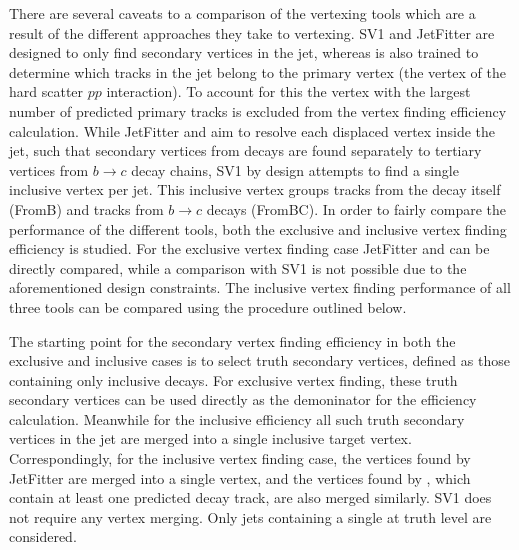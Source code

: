 
There are several caveats to a comparison of the vertexing tools which are a result of the different approaches they take to vertexing.
SV1 and JetFitter are designed to only find secondary vertices in the jet, whereas \GNN is also trained to determine which tracks in the jet belong to the primary vertex (the vertex of the hard scatter $pp$ interaction).
To account for this the \GNN vertex with the largest number of predicted primary tracks is excluded from the vertex finding efficiency calculation.
While JetFitter and \GNN aim to resolve each displaced vertex inside the jet, such that secondary vertices from \bhadron decays are found separately to tertiary vertices from $b \rightarrow c$ decay chains, SV1 by design attempts to find a single inclusive vertex per jet.
This inclusive vertex groups tracks from the \bhadron decay itself (FromB) and tracks from $b \rightarrow c$ decays (FromBC).
In order to fairly compare the performance of the different tools, both the exclusive and inclusive vertex finding efficiency is studied.
For the exclusive vertex finding case JetFitter and \GNN can be directly compared, while a comparison with SV1 is not possible due to the aforementioned design constraints.
The inclusive vertex finding performance of all three tools can be compared using the procedure outlined below.

The starting point for the secondary vertex finding efficiency in both the exclusive and inclusive cases is to select truth secondary vertices, defined as those containing only inclusive \bhadron decays.
For exclusive vertex finding, these truth secondary vertices can be used directly as the demoninator for the efficiency calculation.
Meanwhile for the inclusive efficiency all such truth secondary vertices in the jet are merged into a single inclusive target vertex.
Correspondingly, for the inclusive vertex finding case, the vertices found by JetFitter are merged into a single vertex, and the vertices found by \GNN, which contain at least one predicted \bhadron decay track, are also merged similarly.
SV1 does not require any vertex merging.
Only jets containing a single \bhadron at truth level are considered.

